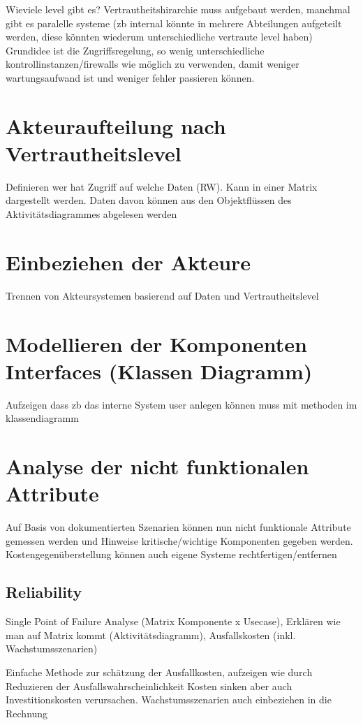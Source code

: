 Wieviele level gibt es? Vertrautheitshirarchie muss aufgebaut werden, manchmal gibt es paralelle systeme (zb internal könnte in mehrere Abteilungen aufgeteilt werden, diese könnten wiederum unterschiedliche vertraute level haben) Grundidee ist die Zugriffsregelung, so wenig unterschiedliche kontrollinstanzen/firewalls wie möglich zu verwenden, damit weniger wartungsaufwand ist und weniger fehler passieren können.

\section{Akteuraufteilung nach Vertrautheitslevel}
Definieren wer hat Zugriff auf welche Daten (RW). Kann in einer Matrix dargestellt werden. Daten davon können aus den Objektflüssen des Aktivitätsdiagrammes abgelesen werden


\section{Einbeziehen der Akteure}
Trennen von Akteursystemen basierend auf Daten und Vertrautheitslevel

\section{Modellieren der Komponenten Interfaces (Klassen Diagramm)}
Aufzeigen dass zb das interne System user anlegen können muss mit methoden im klassendiagramm

\section{Analyse der nicht funktionalen Attribute}
Auf Basis von dokumentierten Szenarien können nun nicht funktionale Attribute gemessen werden und Hinweise kritische/wichtige Komponenten gegeben werden. Kostengegenüberstellung können auch eigene Systeme rechtfertigen/entfernen

\subsection{Reliability}
Single Point of Failure Analyse (Matrix Komponente x Usecase), Erklären wie man auf Matrix kommt (Aktivitätsdiagramm), Ausfallskosten (inkl. Wachstumsszenarien)

Einfache Methode zur schätzung der Ausfallkosten, aufzeigen wie durch Reduzieren der Ausfallswahrscheinlichkeit Kosten sinken aber auch Investitionskosten verursachen. Wachstumsszenarien auch einbeziehen in die Rechnung
